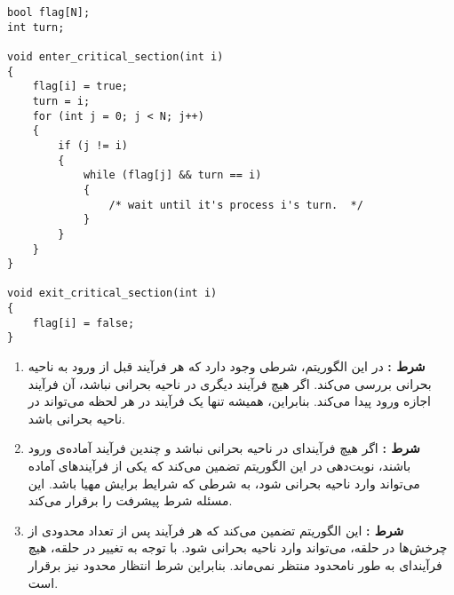\begin{qsolve}
\begin{latin}
\begin{lstlisting}[caption=N process Peterson algorithm, label=cpp_code_example]
bool flag[N];
int turn;

void enter_critical_section(int i)
{
	flag[i] = true;
	turn = i;
	for (int j = 0; j < N; j++) 
	{
		if (j != i) 
		{
			while (flag[j] && turn == i) 
			{
				/* wait until it's process i's turn.  */
			}
		}
	}
}

void exit_critical_section(int i)
{
	flag[i] = false;
}
\end{lstlisting}
\end{latin}	

\begin{enumerate}
	\item 
	\textbf{شرط :}
	در این الگوریتم، شرطی وجود دارد که هر فرآیند قبل از ورود به ناحیه بحرانی بررسی می‌کند. اگر هیچ فرآیند دیگری در ناحیه بحرانی نباشد، آن فرآیند اجازه ورود پیدا می‌کند. بنابراین، همیشه تنها یک فرآیند در هر لحظه می‌تواند در ناحیه بحرانی باشد.
	
	\item 
	\textbf{شرط :}
	اگر هیچ فرآیند‌ای در ناحیه بحرانی نباشد و چندین فرآیند آماده‌ی ورود باشند، نوبت‌دهی در این الگوریتم تضمین می‌کند که یکی از فرآیند‌های آماده می‌تواند وارد ناحیه بحرانی شود، به شرطی که شرایط برایش مهیا باشد. این مسئله شرط پیشرفت را برقرار می‌کند.
	
	
	\item 
	\textbf{شرط :}
	این الگوریتم تضمین می‌کند که هر فرآیند پس از تعداد محدودی از چرخش‌ها در حلقه، می‌تواند وارد ناحیه بحرانی شود. با توجه به تغییر  در حلقه، هیچ فرآیند‌ای به طور نامحدود منتظر نمی‌ماند. بنابراین شرط انتظار محدود نیز برقرار است.	
	
	
	
\end{enumerate}
\end{qsolve}


